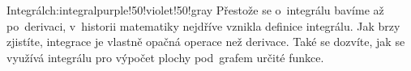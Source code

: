 \begin{chapterintro}{Integrál}{ch:integral}{purple!50!violet!50!gray}{}
    Přestože se o~integrálu bavíme až po~derivaci, v~historii matematiky nejdříve
    vznikla definice integrálu.
    Jak brzy zjistíte, integrace je vlastně opačná operace než derivace.
    Také se dozvíte, jak se využívá integrálu pro výpočet plochy pod~grafem určité
    funkce.
\end{chapterintro}


